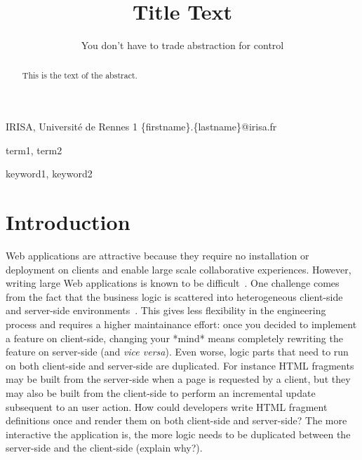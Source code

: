 \documentclass[preprint]{sigplanconf}
\begin{document}
\copyrightdata{[to be supplied]} 


\title{Title Text}
\subtitle{You don’t have to trade abstraction for control}

           {IRISA, Université de Rennes 1}
           {\{firstname\}.\{lastname\}@irisa.fr}

\maketitle

\begin{abstract}
This is the text of the abstract.
\end{abstract}


\terms
term1, term2

\keywords
keyword1, keyword2

\section{Introduction}

Web applications are attractive because they require no installation or deployment on clients and enable large scale
collaborative experiences. However, writing large Web applications is known to be
difficult~\cite{Mikkonen08_SpaghettiJs,Preciado05_RIAMethodologyNecessity}. One challenge comes from the fact
that the business logic is scattered into heterogeneous client-side and server-side
environments~\cite{Echeverria09_RIA,Kuuskeri09_PartitioningClientServer}. This gives less flexibility in the
engineering process and requires a higher maintainance effort: once you decided to implement a feature on
client-side, changing your *mind* means completely rewriting the feature on server-side (and \emph{vice versa}).
Even worse, logic parts that need to run on both client-side and server-side are duplicated. For instance HTML
fragments may be built from the server-side when a page is requested by a client, but they may also be built from the
client-side to perform an incremental update subsequent to an user action. How could developers write HTML fragment
definitions once and render them on both client-side and server-side? The more interactive the application is, the
more logic needs to be duplicated between the server-side and the client-side (explain why?).
\end{document}
